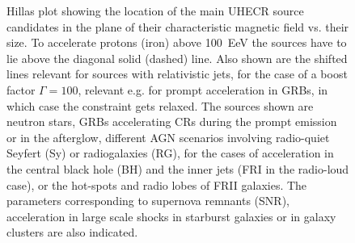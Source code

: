 \documentclass[twoside,12pt]{article}
\begin{document}
\begin{figure}[tb]
\begin{center}
\begin{minipage}[t]{8 cm}
\centerline{}
\end{minipage}
\caption{Hillas plot showing the location of the main UHECR source candidates in the plane of their characteristic magnetic field vs. their size. To accelerate protons (iron) above 100~EeV the sources have to lie above the diagonal solid (dashed) line. Also shown are the shifted lines relevant for sources with relativistic jets, for the case of a boost factor $\Gamma=100$, relevant e.g. for prompt acceleration in  GRBs, in which case the constraint gets relaxed. The sources shown are neutron stars, GRBs accelerating CRs during the prompt emission or in the afterglow, different AGN scenarios involving radio-quiet Seyfert (Sy) or radiogalaxies (RG), for the cases of acceleration in the central black hole (BH) and the inner jets (FRI in the radio-loud case), or the hot-spots and radio lobes of FRII galaxies. The parameters corresponding to  supernova remnants (SNR), acceleration in large scale shocks in starburst galaxies or in galaxy clusters are also indicated.  \label{hillas.fig}}
\end{center}
\end{figure}
\end{document}
